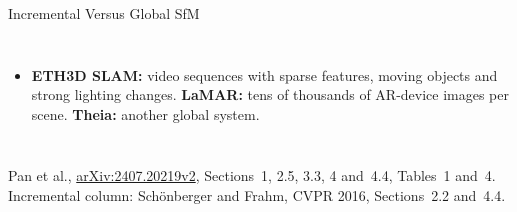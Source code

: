 \begin{frame}{Incremental Versus Global SfM}
\begin{columns}[T,onlytextwidth]
\begin{itemize}
        \item \textbf{ETH3D SLAM:} video sequences with sparse features, moving objects and strong lighting changes. \textbf{LaMAR:} tens of thousands of AR-device images per scene. \textbf{Theia:} another global system.
      \end{itemize}
  \end{columns}
  \vspace{0.5em}
  {\scriptsize Pan et al., \href{https://arxiv.org/abs/2407.20219v2}{arXiv:2407.20219v2}, Sections~1, 2.5, 3.3, 4 and~4.4, Tables~1 and~4. Incremental column: Sch\"onberger and Frahm, CVPR 2016, Sections~2.2 and~4.4.\par}
\end{frame}
